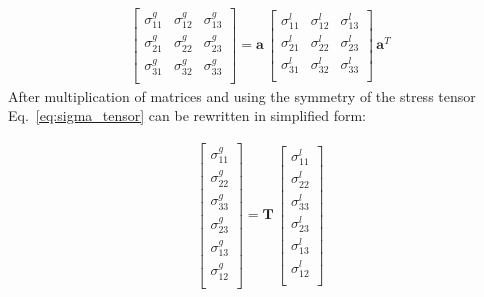 \documentclass[materials,article,submit,moreauthors,pdftex]{Definitions/mdpi}
\providecommand{\DIFadd}[1]{{\protect\color{blue}{#1}}} %
\providecommand{\DIFaddbegin}{} %
\providecommand{\DIFaddend}{} %
\begin{document}
\begin{eqnarray}
\left [ 
\begin{array}{ccc}
\sigma^g_{11} & \sigma^g_{12} & \sigma^g_{13}\\
\sigma^g_{21} & \sigma^g_{22} & \sigma^g_{23}\\
\sigma^g_{31} & \sigma^g_{32} & \sigma^g_{33}\\
\end{array}
\right ]
=
\textbf{a}\,
\left [ 
\begin{array}{ccc}
\sigma^l_{11} & \sigma^l_{12} & \sigma^l_{13}\\
\sigma^l_{21} & \sigma^l_{22} & \sigma^l_{23}\\
\sigma^l_{31} & \sigma^l_{32} & \sigma^l_{33}\\
\end{array}
\right ]
\,\textbf{a}^T
\label{eq:sigma_tensor}
\end{eqnarray}
After multiplication of matrices and using the symmetry of the stress tensor Eq.~\ref{eq:sigma_tensor} can be rewritten in \DIFaddbegin \DIFadd{a }\DIFaddend simplified form:

\begin{eqnarray}
\left [
\begin{array}{c}
\sigma^g_{11}\\
\sigma^g_{22}\\ 
\sigma^g_{33}\\ 
\sigma^g_{23}\\
\sigma^g_{13}\\
\sigma^g_{12}\\
\end{array}
\right ]=
\textbf{T}\,\left [
\begin{array}{c}
\sigma^l_{11}\\
\sigma^l_{22}\\ 
\sigma^l_{33}\\
\sigma^l_{23}\\
\sigma^l_{13}\\
\sigma^l_{12}\\
\end{array}
\right ]
\label{eq:stress}
\end{eqnarray}
\end{document}
